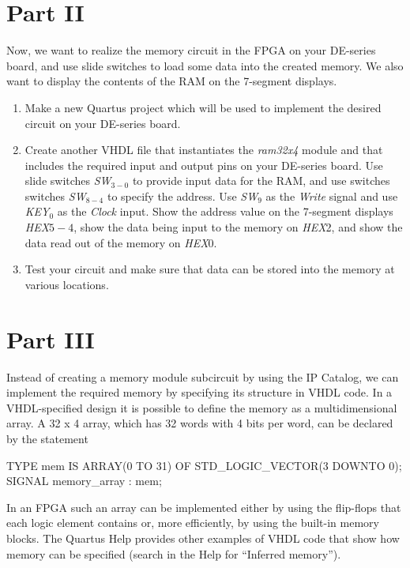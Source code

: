 \documentclass[epsfig,10pt,fullpage]{article}
\begin{document}
\section*{Part II}
Now, we want to realize the memory circuit in the FPGA on your DE-series board, and 
use slide switches to load some data into the created memory. 
We also want to display the contents of the RAM on the 7-segment displays.
\begin{enumerate}
\item Make a new Quartus project which will be used to 
implement the desired circuit on your DE-series board.
\item Create another VHDL file that instantiates the {\it ram32x4} module and that
includes the required input and output pins on your DE-series board. 
Use slide switches {\it SW}$_{3-0}$ to provide input data for
the RAM, and use switches switches {\it SW}$_{8-4}$ to specify the address. 
Use {\it SW}$_{9}$ as the {\it Write} signal and use {\it KEY}$_0$ as the {\it Clock} input. 
Show the address value on the 7-segment displays {\it HEX}$5-4$, show the
data being input to the memory on {\it HEX}2, and show the data read out
of the memory on {\it HEX}0. 
\item Test your circuit and make sure that data can be stored into the memory at various
locations.
\end{enumerate}

\section*{Part III}
Instead of creating a memory module subcircuit by using the IP Catalog, we can implement the 
required memory by specifying its structure in VHDL code.
In a VHDL-specified design it is possible to define the memory as a
multidimensional array. A 32 {\sf x} 4 array, which has 32 words with
4 bits per word, can be declared by the statement

\begin{center}
\begin{minipage}[t]{12.5 cm}
\begin{tabbing}
TYPE mem IS ARRAY(0 TO 31) OF STD\_LOGIC\_VECTOR(3 DOWNTO 0);\\
SIGNAL memory\_array : mem;
\end{tabbing}
\end{minipage}
\end{center}

In an FPGA such an array can be implemented either by using
the flip-flops that each logic element contains or, more efficiently, 
by using the built-in memory blocks.
The Quartus Help provides other examples of VHDL code 
that show how memory can be specified (search in the Help for ``Inferred memory''). 
\end{document}
